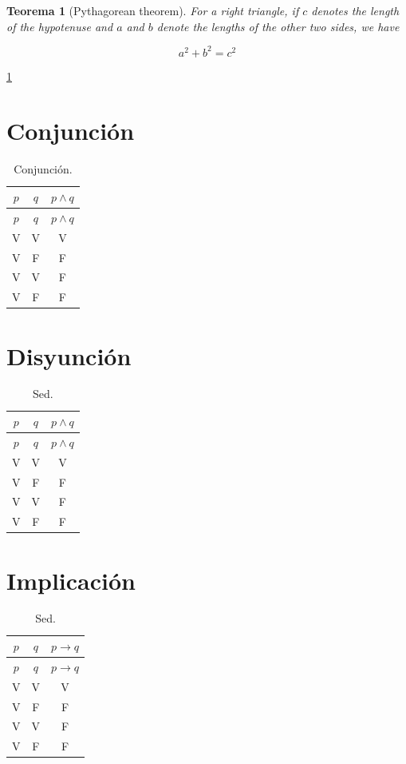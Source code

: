 \documentclass[
  16pt,
]{krantz}
\newtheorem{theorem}{Teorema}[chapter]
\theoremstyle{definition}
\theoremstyle{definition}
\theoremstyle{definition}
\theoremstyle{definition}
\theoremstyle{remark}
\begin{document}
\begin{theorem}[Pythagorean theorem]
\protect\hypertarget{thm:pyth}{}\label{thm:pyth}For a right triangle, if \(c\) denotes the length of the hypotenuse
and \(a\) and \(b\) denote the lengths of the other two sides, we have

\[a^2 + b^2 = c^2\]
\end{theorem}

\ref{thm:pyth}

\hypertarget{conjunciuxf3n}{%
\section{Conjunción}\label{conjunciuxf3n}}

\begin{longtable}[]{@{}ccc@{}}
\caption{\label{tab:ww} Conjunción.}\tabularnewline
\toprule
\(p\) & \(q\) & \(p\wedge q\) \\
\midrule
\endfirsthead
\toprule
\(p\) & \(q\) & \(p\wedge q\) \\
\midrule
\endhead
V & V & V \\
V & F & F \\
V & V & F \\
V & F & F \\
\bottomrule
\end{longtable}

\hypertarget{disyunciuxf3n}{%
\section{Disyunción}\label{disyunciuxf3n}}

\begin{longtable}[]{@{}ccc@{}}
\caption{\label{tab:ww} Sed.}\tabularnewline
\toprule
\(p\) & \(q\) & \(p\wedge q\) \\
\midrule
\endfirsthead
\toprule
\(p\) & \(q\) & \(p\wedge q\) \\
\midrule
\endhead
V & V & V \\
V & F & F \\
V & V & F \\
V & F & F \\
\bottomrule
\end{longtable}

\hypertarget{implicaciuxf3n}{%
\section{Implicación}\label{implicaciuxf3n}}

\begin{longtable}[]{@{}ccc@{}}
\caption{\label{tab:ww} Sed.}\tabularnewline
\toprule
\(p\) & \(q\) & \(p\rightarrow q\) \\
\midrule
\endfirsthead
\toprule
\(p\) & \(q\) & \(p\rightarrow q\) \\
\midrule
\endhead
V & V & V \\
V & F & F \\
V & V & F \\
V & F & F \\
\bottomrule
\end{longtable}
\end{document}

